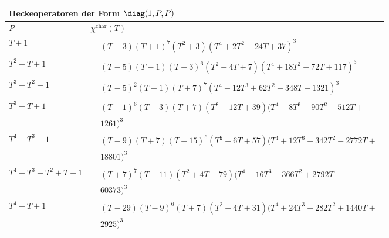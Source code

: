 \begin{tabular}{| l | l |}
\multicolumn{2}{l}{\bf Heckeoperatoren der Form $\diag(1,P,P)$} \\
\hline
$P$ & $\chi^\text{char}(T)$ \\
\hline
$T + 1$ &
$\!\begin{aligned}
	&(T - 3)(T + 1)^{7}(T^{2} + 3)(T^{4} + 2T^{2} - 24T + 37)^{3}\end{aligned}$ \\
\hline
$T^2 + T + 1$ &
$\!\begin{aligned}
	&(T - 5)(T - 1)(T + 3)^{6}(T^{2} + 4T + 7)(T^{4} + 18T^{2} - 72T + 117)^{3}\end{aligned}$ \\
\hline
$T^3 + T^2 + 1$ &
$\!\begin{aligned}
	&(T - 5)^{2}(T - 1)(T + 7)^{7}(T^{4} - 12T^{3} + 62T^{2} - 348T + 1321)^{3}\end{aligned}$ \\
\hline
$T^3 + T + 1$ &
$\!\begin{aligned}
	&(T - 1)^{6}(T + 3)(T + 7)(T^{2} - 12T + 39)(T^{4} - 8T^{3} + 90T^{2} - 512T + \\&
1261)^{3}\end{aligned}$ \\
\hline
$T^4 + T^3 + 1$ &
$\!\begin{aligned}
	&(T - 9)(T + 7)(T + 15)^{6}(T^{2} + 6T + 57)(T^{4} + 12T^{3} + 342T^{2} - 2772T +\\&
18801)^{3}\end{aligned}$ \\
\hline
$T^4 + T^3 + T^2 + T + 1$ &
$\!\begin{aligned}
	&(T + 7)^{7}(T + 11)(T^{2} + 4T + 79)(T^{4} - 16T^{3} - 366T^{2} + 2792T + \\&
60373)^{3}\end{aligned}$ \\
\hline
$T^4 + T + 1$ &
$\!\begin{aligned}
	&(T - 29)(T - 9)^{6}(T + 7)(T^{2} - 4T + 31)(T^{4} + 24T^{3} + 282T^{2} + 1440T +\\&
2925)^{3}\end{aligned}$ \\
\hline
\end{tabular}


